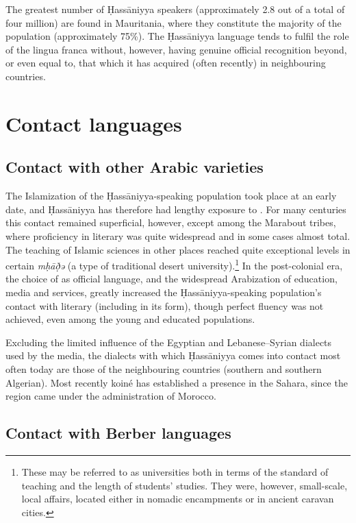 \documentclass[output=paper]{langsci/langscibook}
\begin{document}
The greatest number of Ḥassāniyya speakers (approximately 2.8 out of a total of four million) are found in Mauritania, where they constitute the majority of the population (approximately 75\%). The Ḥassāniyya language tends to fulfil the role of the lingua franca without, however, having genuine official recognition beyond, or even equal to, that which it has acquired (often recently) in neighbouring countries.

\section{Contact languages} %

\subsection{Contact with other Arabic varieties} %

The Islamization of the Ḥassāniyya-speaking population took place at an early date, and Ḥassāniyya has therefore had lengthy exposure to  . For many centuries this contact remained superficial, however, except among the Marabout tribes, where proficiency in literary  was quite widespread and in some cases almost total. The teaching of Islamic sciences in other places reached quite exceptional levels in certain \textit{mḥāð̣ə{\R}} (a type of traditional desert university).\footnote{These may be referred to as universities both in terms of the standard of teaching and the length of students’ studies. They were, however, small-scale, local affairs, located either in nomadic encampments or in ancient caravan cities.} In the post-{colonial} era, the choice of  as official language, and the widespread {Arabization} of education, media and services, greatly increased the Ḥassāniyya-speaking population’s contact with literary  (including in its  form), though perfect fluency was not achieved, even among the young and educated populations. 

Excluding the limited influence of the Egyptian and {Lebanese}–{Syrian} dialects used by the media, the  dialects with which Ḥassāniyya comes into contact most often today are those of the neighbouring countries (southern  and southern Algerian). Most recently  koiné  has established a presence in the  Sahara, since the region came under the administration of Morocco.

\subsection{Contact with Berber languages} %
\end{document}

